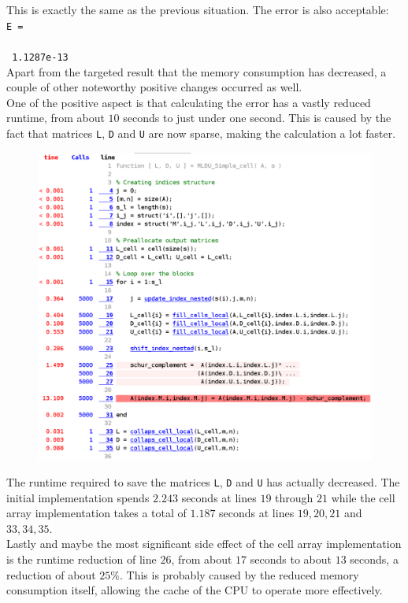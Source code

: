 \noindent This is exactly the same as the previous situation. The error is also acceptable:\\

\noindent \texttt{E =}\\
\\
\noindent \texttt{   1.1287e-13}\\

\noindent Apart from the targeted result that the memory consumption has decreased, a couple of other noteworthy positive changes occurred as well.\\

\noindent One of the positive aspect is that calculating the error has a vastly reduced runtime, from about $10$ seconds to just under one second. This is caused by the fact that matrices \texttt{L}, \texttt{D} and \texttt{U} are now sparse, making the calculation a lot faster.

\begin{figure}[h!]
    \includegraphics[width=\linewidth]{figures/Profile_MLDU_Simple_cell_2.eps}
    \centering
\end{figure}

\noindent The runtime required to save the matrices \texttt{L}, \texttt{D} and \texttt{U} has actually decreased. The initial implementation spends $2.243$ seconds at lines $19$ through $21$ while the cell array implementation takes a total of $1.187$ seconds at lines $19, 20, 21$ and $33, 34, 35$.\\

\noindent Lastly and maybe the most significant side effect of the cell array implementation is the runtime reduction of line $26$, from about $17$ seconds to about $13$ seconds, a reduction of about $25 \%$. This is probably caused by the reduced memory consumption itself, allowing the cache of the CPU to operate more effectively.